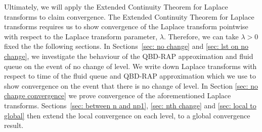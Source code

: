 Ultimately, we will apply the Extended Continuity Theorem for Laplace transforms \cite[Chapter XIII, Theorem 2a]{feller1957} to claim convergence. The Extended Continuity Theorem for Laplace transforms requires us to show convergence of the Laplace transform pointwise with respect to the Laplace transform parameter, \(\lambda\). Therefore, we can take \(\lambda>0\) fixed the the following sections. In Sections~\ref{sec: no change} and \ref{sec: lst on no change}, we investigate the behaviour of the QBD-RAP approximation and fluid queue on the event of no change of level. We write down Laplace transforms with respect to time of the fluid queue and QBD-RAP approximation which we use to show convergence on the event that there is no change of level. In Section \ref{sec: no change convergence} we prove convergence of the aforementioned Laplace transforms. Sections~\ref{sec: between n and np1}, \ref{sec: nth change} and \ref{sec: local to global} then extend the local convergence on each level, to a global convergence result. 

%

